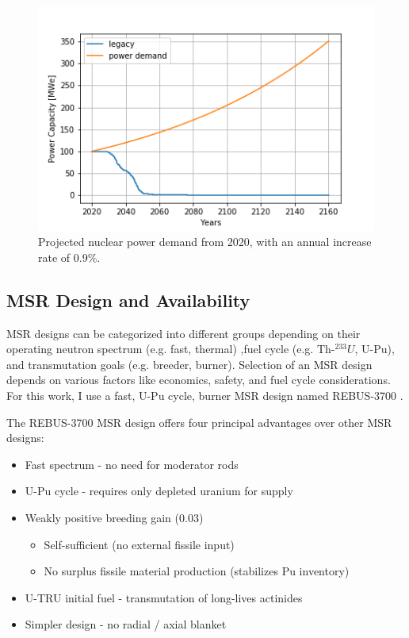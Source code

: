 \begin{figure}[htbp!]
	\begin{center}
		\includegraphics[scale=0.6]{./images/us/projection.png}
	\end{center}
	\caption{Projected nuclear power demand from 2020, with an
			 annual increase rate of 0.9\%.}
	\label{fig:us_proj}
\end{figure}

\subsection{\gls{MSR} Design and Availability}


\gls{MSR} designs can be categorized into
different groups depending on their operating
neutron spectrum (e.g. fast, thermal) ,fuel cycle (e.g. Th-$^{233}U$, U-Pu),
and transmutation goals (e.g. breeder, burner). Selection of an \gls{MSR}
design depends on various factors like economics, safety, and fuel cycle
considerations. For this work, I use a fast, U-Pu cycle, burner \gls{MSR} design
named REBUS-3700 \cite{mourogov_potentialities_2006}.

The REBUS-3700 \gls{MSR} design offers four principal
advantages over other \gls{MSR} designs:
\begin{itemize}
	\item Fast spectrum - no need for moderator rods 
	\item U-Pu cycle - requires only depleted uranium for supply
	\item Weakly positive breeding gain (0.03)
	\begin{itemize}
		\item Self-sufficient (no external fissile input)
		\item No surplus fissile material production (stabilizes Pu inventory)
	\end{itemize}
	\item U-\gls{TRU} initial fuel - transmutation of long-lives actinides
	\item Simpler design - no radial / axial blanket
\end{itemize}


